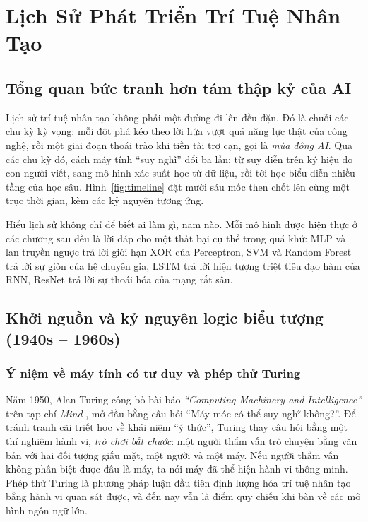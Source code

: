 \chapter{Lịch Sử Phát Triển Trí Tuệ Nhân Tạo}
\label{ch:lich-su}

\section{Tổng quan bức tranh hơn tám thập kỷ của AI}

Lịch sử trí tuệ nhân tạo không phải một đường đi lên đều đặn. Đó là chuỗi các chu kỳ kỳ vọng: mỗi đột phá kéo theo
lời hứa vượt quá năng lực thật của công nghệ, rồi một giai đoạn thoái trào khi tiền tài trợ cạn, gọi là
\emph{mùa đông AI}. Qua các chu kỳ đó, cách máy tính “suy nghĩ” đổi ba lần: từ suy diễn trên ký hiệu do con người
viết, sang mô hình xác suất học từ dữ liệu, rồi tới học biểu diễn nhiều tầng của học sâu. Hình~\ref{fig:timeline}
đặt mười sáu mốc then chốt lên cùng một trục thời gian, kèm các kỷ nguyên tương ứng.


Hiểu lịch sử không chỉ để biết ai làm gì, năm nào. Mỗi mô hình được hiện thực ở các chương sau đều là lời đáp cho
một thất bại cụ thể trong quá khứ: MLP và lan truyền ngược trả lời giới hạn XOR của Perceptron, SVM và Random Forest
trả lời sự giòn của hệ chuyên gia, LSTM trả lời hiện tượng triệt tiêu đạo hàm của RNN, ResNet trả lời sự thoái hóa của
mạng rất sâu.

\section{Khởi nguồn và kỷ nguyên logic biểu tượng (1940s -- 1960s)}

\subsection{Ý niệm về máy tính có tư duy và phép thử Turing}

Năm 1950, Alan Turing công bố bài báo \emph{“Computing Machinery and Intelligence”} trên tạp chí \emph{Mind}
\cite{turing1950}, mở đầu bằng câu hỏi “Máy móc có thể suy nghĩ không?”. Để tránh tranh cãi triết học về khái niệm
“ý thức”, Turing thay câu hỏi bằng một thí nghiệm hành vi, \emph{trò chơi bắt chước}: một người thẩm vấn trò chuyện
bằng văn bản với hai đối tượng giấu mặt, một người và một máy. Nếu người thẩm vấn không phân biệt được đâu là máy,
ta nói máy đã thể hiện hành vi thông minh. Phép thử Turing là phương pháp luận đầu tiên định lượng hóa trí tuệ nhân
tạo bằng hành vi quan sát được, và đến nay vẫn là điểm quy chiếu khi bàn về các mô hình ngôn ngữ lớn.

